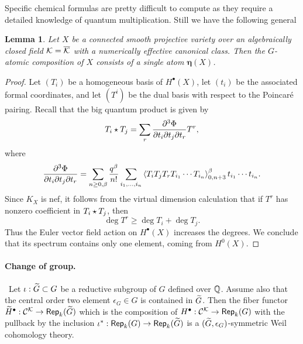 \documentclass[twoside,leqno]{article}
\numberwithin{equation}{section}
\theoremstyle{plain}
\newtheorem{lemma}[equation]{Lemma}
\theoremstyle{definition}
\begin{document}
\bigskip 


Specific chemical formulas are pretty difficult to compute as they require a detailed knowledge of quantum multiplication. Still we have the 
following general

\begin{lemma} \label{lem:GatomsnefK}
Let $X$ be a connected smooth projective variety over an algebraically closed field 
$\mathcal K = \overline{\mathcal K}$ with a numerically effective canonical class.
Then the $G$-atomic composition of $X$ consists of a single atom
$\boldsymbol{\eta}(X)$.
\end{lemma}
\begin{proof}
    Let $(T_i)$ be a homogeneous basis of $H^{\bullet}(X)$, let $(t_i)$ be the associated formal coordinates, and let $(T^i)$ be the dual basis with respect to the Poincar\'{e} pairing.
    Recall that the big quantum product is given by
    \[ T_i \star T_j = \sum_r \frac{\partial^3 \Phi}{\partial t_i \partial t_j \partial t_r} T^r, \]
    where
    \[
    \frac{\partial^3\Phi}{\partial t_i \partial t_j \partial t_r} = \sum_{n\ge 0,\beta} \frac{q^\beta}{n!} \sum_{i_1,\dots,i_n} \braket{T_i T_j T_r T_{i_1}\cdots T_{i_n}}_{0,n+3}^{\beta} t_{i_1}\cdots t_{i_n} .\]
    Since $K_X$ is nef, it follows from the virtual dimension calculation that if $T^r$ has nonzero coefficient in $T_i \star T_j$, then
    \[ \deg T^r \ge \deg T_i + \deg T_j. \]
    Thus the Euler vector field action on $H^{\bullet}(X)$ increases the degrees.
    We conclude that its spectrum contains only one element, coming from $H^0(X)$.
\end{proof}
 
\paragraph{Change of group.} \label{par:changeG}  \ Let $\iota : \widetilde G \subset G$ be a reductive subgroup of $G$ defined over $\mathbb Q$. Assume also that the central order two element 
$\epsilon_{G} \in G$ is contained in $\widetilde G$. Then the fiber functor \linebreak 
$\widetilde H^{\bullet} : \mathcal{C}^{\mathcal K} \to \mathsf{Rep}_{k}(\widetilde G)$ which is the composition of $H^{\bullet} : \mathcal{C}^{\mathcal K} \to \mathsf{Rep}_{k}(G)$ with the pullback by the inclusion 
$\iota^{*} : \mathsf{Rep}_{k}(G) \to \mathsf{Rep}_{k}(\widetilde G)$ is a $(\widetilde G,\epsilon_{G})$-symmetric Weil cohomology theory. 
\end{document}
